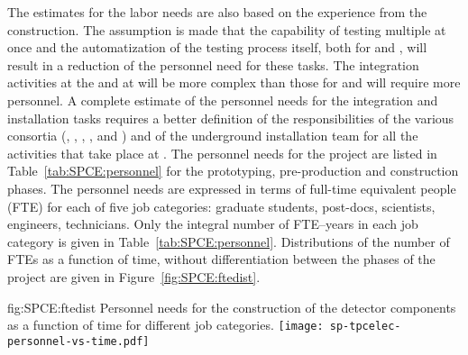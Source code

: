 The estimates for the labor needs are also based on the
experience from the  construction. The assumption
is made that the capability of testing multiple 
at once and the automatization of the testing process itself,
both for  and , will result in
a reduction of the personnel need for these tasks. The
integration activities at the  and at \surf
will be more complex than those for  and
will require more personnel. A complete estimate of the
personnel needs for the integration and installation tasks
requires a better definition of the responsibilities of
the various consortia (, , ,
, and ) and of the underground
installation team for all the activities that take place
at \surf. The personnel needs for the project are listed in
Table~\ref{tab:SPCE:personnel} for the prototyping,
pre-production and construction phases. The personnel
needs are expressed in terms of full-time equivalent
people (FTE) for each of five job categories: graduate students,
post-docs, scientists, engineers, technicians. Only the
integral number of FTE--years in each job category is given
in Table~\ref{tab:SPCE:personnel}. Distributions of the number of FTEs as
a function of time, without differentiation between the
phases of the project are given in Figure~\ref{fig:SPCE:ftedist}.

\begin{dunefigure}
{fig:SPCE:ftedist}
{Personnel needs for the construction of the  detector components 
as a function of time for different job categories.}
\texttt{[image: sp-tpcelec-personnel-vs-time.pdf]}
\end{dunefigure}

